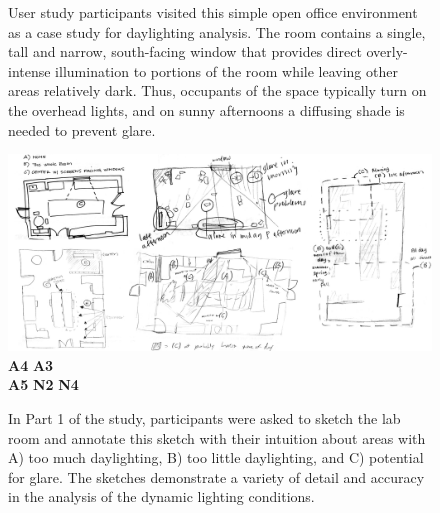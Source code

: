 \documentclass{article}
\begin{document}
\begin{figure}[t]
\caption{User study participants visited this simple open office
  environment as a case study for daylighting analysis.  The room
  contains a single, tall and narrow, south-facing window that
  provides direct overly-intense illumination to portions of the room
  while leaving other areas relatively dark.  Thus, occupants of the
  space typically turn on the overhead lights, and on sunny afternoons
  a diffusing shade is needed to prevent glare.
}
\label{figure:example_room}
\end{figure}




\begin{figure}[t]
%
\includegraphics[width=7.0in]{../gi2012_userstudy/images/sketches/all_together}%
%
\vspace{-2.7in}
{\bf A4} \hspace{1.9in}
{\bf A3}
\vspace{2.3in}
\\
{\bf A5} \hspace{1.8in}
{\bf N2} \hspace{3in}
{\bf N4}
\vspace{-0.1in}\\
%
\caption{In Part 1 of the study, participants were asked to sketch the
  lab room and annotate this sketch with their intuition about areas
  with A) too much daylighting, B) too little daylighting, and C)
  potential for glare.  The sketches demonstrate a variety of detail
  and accuracy in the analysis of the dynamic lighting conditions. }
\label{figure:sketches}
\end{figure}
\end{document}
